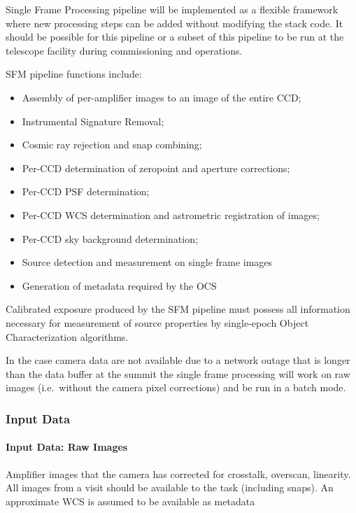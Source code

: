 Single Frame Processing pipeline will be implemented as a flexible   framework where new processing steps can be added without modifying the stack code. It should be possible for this pipeline or a subset of this pipeline  to be run at the telescope facility during commissioning and operations.  


SFM pipeline functions include:
\begin{itemize}
\item Assembly of per-amplifier images to an image of the entire CCD;
\item Instrumental Signature Removal;
\item Cosmic ray rejection and snap combining;
\item Per-CCD determination of zeropoint and aperture corrections;
\item Per-CCD PSF determination;
\item Per-CCD WCS determination and astrometric registration of images;
\item Per-CCD sky background determination;
\item Source detection and measurement on single frame images
\item Generation of metadata required by the OCS
\end{itemize}

Calibrated exposure produced by the SFM pipeline must possess all information necessary for measurement of source properties by single-epoch Object Characterization algorithms.


In the case camera data are not available due to a network outage that is longer than the data buffer at the summit the single frame processing will work on raw images (i.e.\ without the camera pixel corrections) and be run in a batch mode. 

\subsubsection{Input Data}

\paragraph*{Input Data: Raw Images}

Amplifier images that the camera has corrected for crosstalk, overscan, linearity.  All images from a visit should be available to the task (including snaps). An approximate WCS is assumed to be available as metadata

